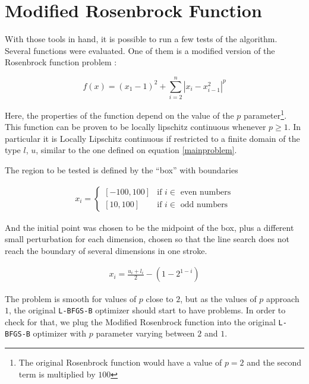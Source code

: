 \section{Modified Rosenbrock Function} \label{ros}

With those tools in hand, it is possible to run a few tests of the algorithm. Several functions were evaluated. One of them is a modified version of the Rosenbrock function problem \citep{rosenbrock}:

\begin{equation} \label{modifiedrosenbrock}
    f(x) = (x_1 - 1)^2 + \sum_{i = 2}^n |x_i - x_{i - 1}^2|^p
\end{equation}

Here, the properties of the function depend on the value of the $p$ parameter\footnote{The original Rosenbrock function would have a value of $p = 2$ and the second term is multiplied by $100$}. This function can be proven to be locally lipschitz continuous whenever $p \geq 1$. In particular it is Locally Lipschitz continuous if restricted to a finite domain of the type $l$, $u$, similar to the one defined on equation \eqref{mainproblem}.

The region to be tested is defined by the ``box'' with boundaries

\begin{equation}
  \begin{aligned}
    x_i = 
    \begin{cases}
      [-100, 100] & \text{if } i \in \text{ even numbers} \\
      [10, 100] & \text{if } i \in \text{ odd numbers}
    \end{cases}
  \end{aligned}
\end{equation}

And the initial point was chosen to be the midpoint of the box, plus a different small perturbation for each dimension, chosen so that the line search does not reach the boundary of several dimensions in one stroke.

\begin{equation}
  \begin{aligned}
    x_i = \frac{u_i + l_i}{2} - \left(1 - 2^{1 - i}\right)
  \end{aligned}
\end{equation}

The problem is smooth for values of $p$ close to $2$, but as the values of $p$ approach $1$, the original \texttt{L-BFGS-B} optimizer should start to have problems. In order to check for that, we plug the Modified Rosenbrock function into the original \texttt{L-BFGS-B} optimizer with $p$ parameter varying between $2$ and $1$. 


